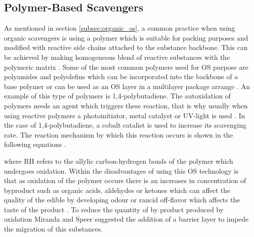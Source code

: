 \begin{refsection}
\subsection{Polymer-Based Scavengers}\label{subsec:polymer_os}
As mentioned in section \ref{subsec:organic_os},  a common practice when using organic scavengers is using a polymer which is suitable for packing purposes and modified with reactive side chains attached to the substance backbone. This can be  achieved by making homogeneous blend of reactive substances with the polymeric matrix \cite{Cooksey2010OxygenSystems}. Some of the most common polymers used for OS purpose are polyamides and polyolefins which can be incorporated into the backbone of a base polymer or can be used as an OS layer in a multilayer package arrange \cite{Gaikwad2018OxygenPackaging}. An example of this type of polymers is 1,4-polybutadiene. The autoxidation of polymers needs an agent which triggers these reaction, that is why usually when using reactive polymers a photoinitiator, metal catalyst or  UV-light is used \cite{Galdi2008ProductionActivity}. In the case of 1,4-polybutadiene, a cobalt catalist is used to increase its scavenging rate. The reaction mechanism by which this reaction occurs is shown in the following equations \cite{Li2012Characterization14-Polybutadiene}.


where RH refers to the allylic carbon-hydrogen bonds of the polymer which undergoes oxidation. Within the disadvantages of using this OS technology 
is that as oxidation of the polymer occurs there is an increases in concentration of byproduct such as  organic acids, aldehydes or ketones  which can affect the quality of the edible by developing odour or rancid off-flavor which affects the taste of the product \cites{Li2012Characterization14-Polybutadiene}{Gaikwad2018OxygenPackaging}. To reduce the quantity of by product produced by oxidation Miranda  and Speer \cite{Miranda2005PolylacticArticle}  suggested  the addition of a barrier layer to impede the migration of this substances. 


\end{refsection}
